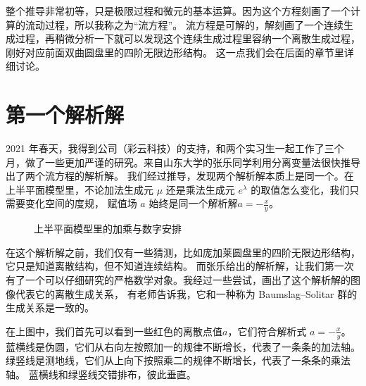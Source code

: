\documentclass[a4paper,12pt]{book}
\numberwithin{problem}{section}
\numberwithin{definition}{section}
\numberwithin{lemma}{section}
\numberwithin{proposition}{section}
\numberwithin{theorem}{section}
\numberwithin{grammar}{section}
\numberwithin{program}{section}
\numberwithin{convention}{section}
\numberwithin{corollary}{section}
\begin{document}
整个推导非常初等，只是极限过程和微元的基本运算。因为这个方程刻画了一个计算的流动过程，所以我称之为“流方程”。
流方程是可解的，解刻画了一个连续生成过程，再稍微分析一下就可以发现这个连续生成过程里容纳一个离散生成过程，刚好对应前面双曲圆盘里的四阶无限边形结构。
这一点我们会在后面的章节里详细讨论。

\section{第一个解析解}

2021 年春天，我得到公司（彩云科技）的支持，和两个实习生一起工作了三个月，做了一些更加严谨的研究。来自山东大学的张乐同学利用分离变量法很快推导出了两个流方程的解析解。
我们经过推导，发现两个解析解本质上是同一个。在上半平面模型里，不论加法生成元 $\mu$ 还是乘法生成元 $e^\lambda$ 的取值怎么变化，我们只需要变化空间的度规，
赋值场 $a$ 始终是同一个解析解$a = - \frac{x}{y}$。

\begin{figure}[ht]\centering
{}
\caption{上半平面模型里的加乘与数字安排}\label{fig:assignment1}
\end{figure}

在这个解析解之前，我们仅有一些猜测，比如庞加莱圆盘里的四阶无限边形结构，它只是知道离散结构，但不知道连续结构。
而张乐给出的解析解，让我们第一次有了一个可以仔细研究的严格数学对象。我经过一些尝试，画出了这个解析解的图像代表它的离散生成关系，
有老师告诉我，它和一种称为 Baumslag–Solitar 群的生成关系是一致的。

在上图中，我们首先可以看到一些红色的离散点值$a$，它们符合解析式 $a = -\frac{x}{y}$。
蓝横线是伪圆，它们从右向左按照加一的规律不断增长，代表了一条条的加法轴。 绿竖线是测地线，它们从上向下按照乘二的规律不断增长，代表了一条条的乘法轴。
蓝横线和绿竖线交错排布，彼此垂直。
\end{document}
